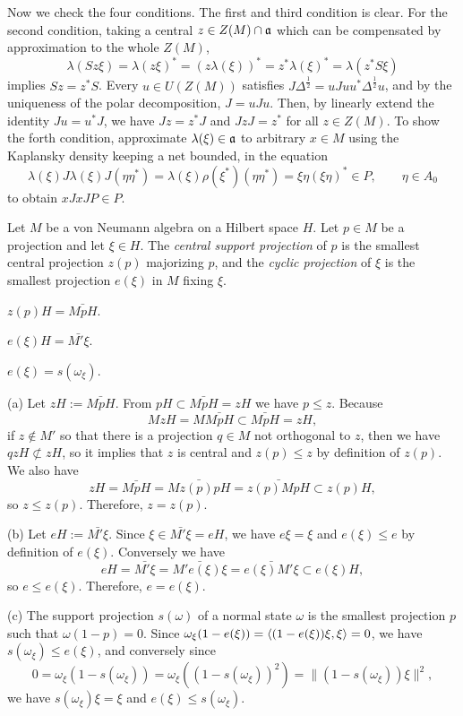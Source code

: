 \documentclass{../../../small}
\begin{document}
\begin{pf}
Now we check the four conditions.
The first and third condition is clear.
For the second condition, taking a central $z\in Z(M)\cap\mathfrak{a}$ which can be compensated by approximation to the whole $Z(M)$,
\[\lambda(Sz\xi)=\lambda(z\xi)^*=(z\lambda(\xi))^*=z^*\lambda(\xi)^*=\lambda(z^*S\xi)\]
implies $Sz=z^*S$.
Every $u\in U(Z(M))$ satisfies $J\Delta^{\frac12}=uJuu^*\Delta^{\frac12}u$, and by the uniqueness of the polar decomposition, $J=uJu$.
Then, by linearly extend the identity $Ju=u^*J$, we have $Jz=z^*J$ and $JzJ=z^*$ for all $z\in Z(M)$.
To show the forth condition, approximate $\lambda(\xi)\in\mathfrak{a}$ to arbitrary $x\in M$ using the Kaplansky density keeping a net bounded, in the equation
\[\lambda(\xi)J\lambda(\xi)J(\eta\eta^*)=\lambda(\xi)\rho(\xi^*)(\eta\eta^*)=\xi\eta(\xi\eta)^*\in P,\qquad\eta\in A_0\]
to obtain $xJxJP\in P$.
\end{pf}

\begin{lem}
Let $M$ be a von Neumann algebra on a Hilbert space $H$.
Let $p\in M$ be a projection and let $\xi\in H$.
The \emph{central support projection} of $p$ is the smallest central projection $z(p)$ majorizing $p$, and the \emph{cyclic projection} of $\xi$ is the smallest projection $e(\xi)$ in $M$ fixing $\xi$.
\begin{parts}
\item $z(p)H=\bar{MpH}$.
\item $e(\xi)H=\bar{M'\xi}$.
\item $e(\xi)=s(\omega_\xi)$.
\end{parts}
\end{lem}
\begin{pf}
(a)
Let $zH:=\bar{MpH}$.
From $pH\subset\bar{MpH}=zH$ we have $p\le z$.
Because
\[MzH=M\bar{MpH}\subset\bar{MpH}=zH,\]
if $z\notin M'$ so that there is a projection $q\in M$ not orthogonal to $z$, then we have $qzH\not\subset zH$, so it implies that $z$ is central and $z(p)\le z$ by definition of $z(p)$.
We also have
\[zH=\bar{MpH}=\bar{Mz(p)pH}=\bar{z(p)MpH}\subset z(p)H,\]
so $z\le z(p)$.
Therefore, $z=z(p)$.

(b)
Let $eH:=\bar{M'\xi}$.
Since $\xi\in\bar{M'\xi}=eH$, we have $e\xi=\xi$ and $e(\xi)\le e$ by definition of $e(\xi)$.
Conversely we have
\[eH=\bar{M'\xi}=\bar{M'e(\xi)\xi}=\bar{e(\xi)M'\xi}\subset e(\xi)H,\]
so $e\le e(\xi)$.
Therefore, $e=e(\xi)$.

(c)
The support projection $s(\omega)$ of a normal state $\omega$ is the smallest projection $p$ such that $\omega(1-p)=0$.
Since $\omega_\xi(1-e(\xi))=\langle(1-e(\xi))\xi,\xi\rangle=0$, we have $s(\omega_\xi)\le e(\xi)$, and conversely since
\[0=\omega_\xi(1-s(\omega_\xi))=\omega_\xi((1-s(\omega_\xi))^2)=\|(1-s(\omega_\xi))\xi\|^2,\]
we have $s(\omega_\xi)\xi=\xi$ and $e(\xi)\le s(\omega_\xi)$.
\end{pf}
\end{document}
